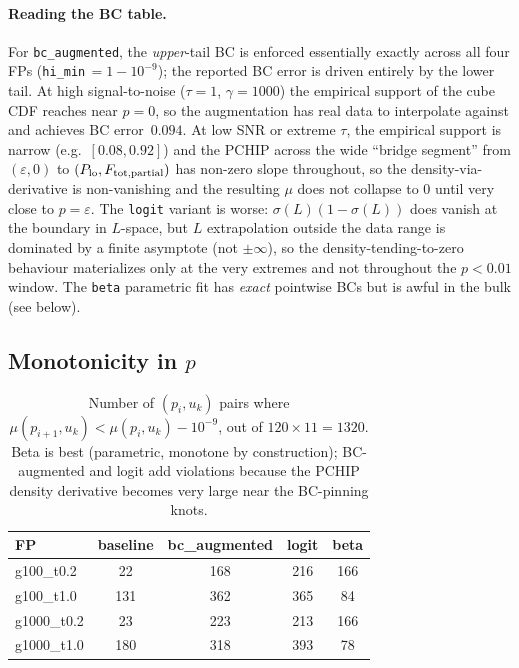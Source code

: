 \documentclass[11pt]{article}
\begin{document}
\paragraph{Reading the BC table.} For \texttt{bc\_augmented}, the
\emph{upper}-tail BC is enforced essentially exactly across all four FPs
(\texttt{hi\_min}$\,=1-10^{-9}$); the reported BC error is driven entirely by
the lower tail. At high signal-to-noise ($\tau=1$, $\gamma=1000$) the
empirical support of the cube CDF reaches near $p=0$, so the augmentation has
real data to interpolate against and achieves BC error $\,0.094$. At low SNR
or extreme $\tau$, the empirical support is narrow (e.g.\ $[0.08, 0.92]$) and
the PCHIP across the wide ``bridge segment'' from $(\varepsilon,0)$ to
$(P_{\rm lo}, F_{\rm tot,partial})$ has non-zero slope throughout, so the
density-via-derivative is non-vanishing and the resulting $\mu$ does not
collapse to $0$ until very close to $p=\varepsilon$. The \texttt{logit}
variant is worse: $\sigma(L)(1-\sigma(L))$ does vanish at the boundary in
$L$-space, but $L$ extrapolation outside the data range is dominated by a
finite asymptote (not $\pm\infty$), so the density-tending-to-zero behaviour
materializes only at the very extremes and not throughout the $p<0.01$
window. The \texttt{beta} parametric fit has \emph{exact} pointwise BCs but
is awful in the bulk (see below).

\subsection{Monotonicity in $p$}

\begin{table}[h]
\centering
\caption{Number of $(p_i, u_k)$ pairs where $\mu(p_{i+1},u_k) < \mu(p_i,u_k) - 10^{-9}$, out of $120\times 11 = 1320$.
         Beta is best (parametric, monotone by construction);
         BC-augmented and logit add violations because the PCHIP density
         derivative becomes very large near the BC-pinning knots.}
\begin{tabular}{lcccc}
\toprule
FP  & baseline & bc\_augmented & logit & beta \\
\midrule
g100\_t0.2  &  22 & 168 & 216 & 166 \\
g100\_t1.0  & 131 & 362 & 365 &  84 \\
g1000\_t0.2 &  23 & 223 & 213 & 166 \\
g1000\_t1.0 & 180 & 318 & 393 &  78 \\
\bottomrule
\end{tabular}
\end{table}
\end{document}
